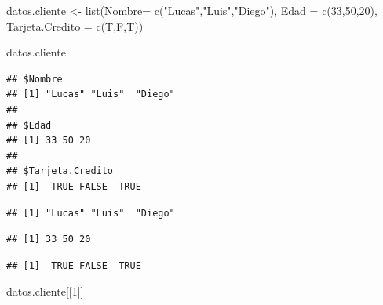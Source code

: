 \documentclass[
  12pt,
]{book}
\newenvironment{Shaded}{\begin{snugshade}}{\end{snugshade}}
\newcommand{\AttributeTok}[1]{\textcolor[rgb]{0.77,0.63,0.00}{#1}}
\newcommand{\DecValTok}[1]{\textcolor[rgb]{0.00,0.00,0.81}{#1}}
\newcommand{\FunctionTok}[1]{\textcolor[rgb]{0.00,0.00,0.00}{#1}}
\newcommand{\NormalTok}[1]{#1}
\newcommand{\OtherTok}[1]{\textcolor[rgb]{0.56,0.35,0.01}{#1}}
\newcommand{\SpecialCharTok}[1]{\textcolor[rgb]{0.00,0.00,0.00}{#1}}
\newcommand{\StringTok}[1]{\textcolor[rgb]{0.31,0.60,0.02}{#1}}
\begin{document}
\begin{Shaded}
\begin{Highlighting}[]
\NormalTok{datos.cliente }\OtherTok{\textless{}{-}} \FunctionTok{list}\NormalTok{(}\AttributeTok{Nombre=} \FunctionTok{c}\NormalTok{(}\StringTok{"Lucas"}\NormalTok{,}\StringTok{"Luis"}\NormalTok{,}\StringTok{"Diego"}\NormalTok{), }\AttributeTok{Edad =} \FunctionTok{c}\NormalTok{(}\DecValTok{33}\NormalTok{,}\DecValTok{50}\NormalTok{,}\DecValTok{20}\NormalTok{), }\AttributeTok{Tarjeta.Credito =} \FunctionTok{c}\NormalTok{(T,F,T))}

\NormalTok{datos.cliente}
\end{Highlighting}
\end{Shaded}

\begin{verbatim}
## $Nombre
## [1] "Lucas" "Luis"  "Diego"
## 
## $Edad
## [1] 33 50 20
## 
## $Tarjeta.Credito
## [1]  TRUE FALSE  TRUE
\end{verbatim}

\begin{Shaded}
\end{Shaded}

\begin{verbatim}
## [1] "Lucas" "Luis"  "Diego"
\end{verbatim}

\begin{Shaded}
\end{Shaded}

\begin{verbatim}
## [1] 33 50 20
\end{verbatim}

\begin{Shaded}
\end{Shaded}

\begin{verbatim}
## [1]  TRUE FALSE  TRUE
\end{verbatim}

\begin{Shaded}
\begin{Highlighting}[]
\NormalTok{datos.cliente[[}\DecValTok{1}\NormalTok{]]}
\end{Highlighting}
\end{Shaded}
\end{document}
